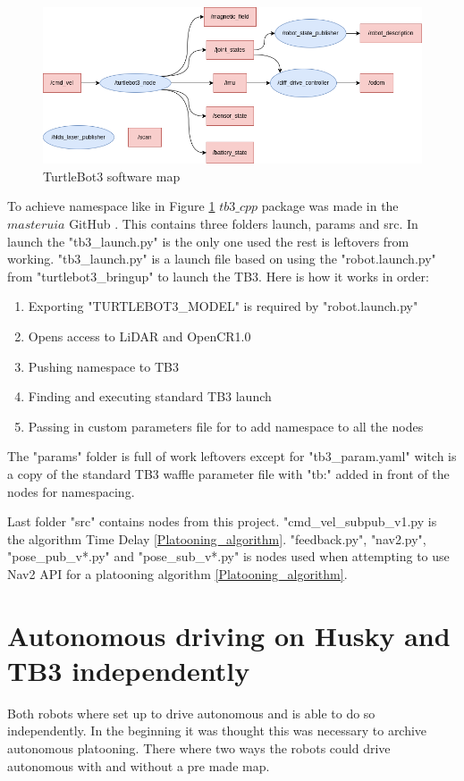 \begin{figure}[H]
    \centering
    \includegraphics[width = 1\textwidth]{Figures/drawio/TB3_rqt.drawio.png}
    \caption{TurtleBot3 software map}
    \label{fig:TB3SW}
\end{figure}

To achieve namespace like in Figure \ref{fig:TB3SW} $tb3\_cpp$ package was made in the $masteruia$ GitHub \cite{masteruia}. This contains three folders launch, params and src. In launch the "tb3\_launch.py" is the only one used the rest is leftovers from working. "tb3\_launch.py" is  a launch file based on using the "robot.launch.py" from "turtlebot3\_bringup" \cite{turtlebot3galactic} to launch the TB3. Here is how it works in order: 
\begin{enumerate}
\item Exporting "TURTLEBOT3\_MODEL" is required by "robot.launch.py" 
\item Opens access to LiDAR and OpenCR1.0 
\item Pushing namespace to TB3 
\item Finding and executing standard TB3 launch
\item Passing in custom parameters file for to add namespace to all the nodes 
\end{enumerate}  

The "params" folder is full of work leftovers except for "tb3\_param.yaml" witch is a copy of the standard TB3 waffle parameter file with "tb:" added in front of the nodes for namespacing.

Last folder "src" contains nodes from this project. "cmd\_vel\_subpub\_v1.py is the algorithm Time Delay \ref{Platooning_algorithm}. "feedback.py", "nav2.py", "pose\_pub\_v*.py" and "pose\_sub\_v*.py" is nodes used when attempting to use Nav2 API for a platooning algorithm \ref{Platooning_algorithm}.

\section{Autonomous driving on Husky and TB3 independently}
Both robots where set up to drive autonomous and is able to do so independently. In the beginning it was thought this was necessary to archive autonomous platooning. There where two ways the robots could drive autonomous with and without a pre made map. 

